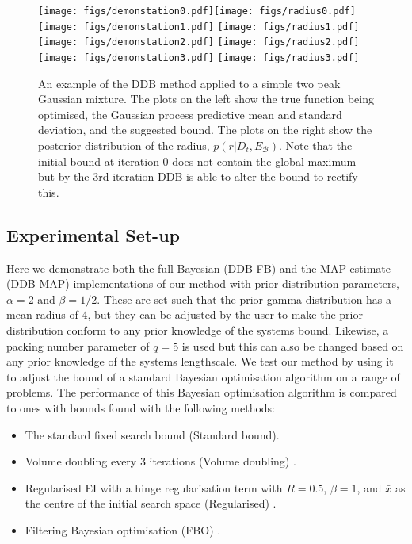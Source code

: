 \documentclass[preprint]{elsarticle}
\begin{document}
\begin{figure}
\centering
\texttt{[image: figs/demonstation0.pdf]}\texttt{[image: figs/radius0.pdf]}
\texttt{[image: figs/demonstation1.pdf]}
\texttt{[image: figs/radius1.pdf]}
\texttt{[image: figs/demonstation2.pdf]}
\texttt{[image: figs/radius2.pdf]}
\texttt{[image: figs/demonstation3.pdf]}
\texttt{[image: figs/radius3.pdf]}
\caption{An example of the DDB method applied to a simple two peak Gaussian mixture. The plots on the left show the true function being optimised, the Gaussian process predictive mean and standard deviation, and the suggested bound. The plots on the right show the posterior distribution of the radius, $p(r|D_t,E_{\mathcal{B}})$. Note that the initial bound at iteration $0$ does not contain the global maximum but by the 3rd iteration DDB is able to alter the bound to rectify this.\label{fig:bound_example}}
\end{figure}

\subsection{Experimental Set-up} \label{sec:4p1}
Here we demonstrate both the full Bayesian (DDB-FB) and the MAP estimate (DDB-MAP) implementations of our method with prior distribution parameters, $\alpha=2$ and $\beta=1/2$. These are set such that the prior gamma distribution has a mean radius of 4, but they can be adjusted by the user to make the prior distribution conform to any prior knowledge of the systems bound. Likewise, a packing number parameter of $q=5$ is used but this can also be changed based on any prior knowledge of the systems lengthscale. We test our method by using it to adjust the bound of a standard Bayesian optimisation algorithm on a range of problems. The performance of this Bayesian optimisation algorithm is compared to ones with bounds found with the following methods:
\begin{itemize}
\item The standard fixed search bound (Standard bound).
\item Volume doubling every 3 iterations (Volume doubling) \citep{shahriari2016unbounded}.
\item Regularised EI with a hinge regularisation term with $R=0.5$, $\beta=1$, and $\bar{x}$ as the centre of the initial search space (Regularised) \citep{shahriari2016unbounded}.
\item Filtering Bayesian optimisation (FBO) \citep{nguyen2018filtering}.
\end{itemize}
\end{document}

